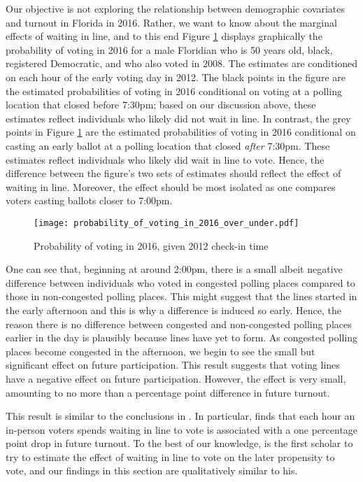 \documentclass[12pt,titlepage]{article}
\begin{document}
Our objective is not exploring the relationship between demographic
covariates and turnout in Florida in 2016.  Rather, we want to know
about the marginal effects of waiting in line, and to this end Figure
\ref{fig:prvoting2016} displays graphically the probability of voting
in 2016 for a male Floridian who is 50 years old, black, registered
Democratic, and who also voted in 2008.  The estimates are conditioned
on each hour of the early voting day in 2012. The black points in the
figure are the estimated probabilities of voting in 2016 conditional
on voting at a polling location that closed before 7:30pm; based on
our discussion above, these estimates reflect individuals who likely
did not wait in line.  In contrast, the grey points in Figure
\ref{fig:prvoting2016} are the estimated probabilities of voting in
2016 conditional on casting an early ballot at a polling location that
closed \emph{after} 7:30pm.  These estimates reflect individuals who
likely did wait in line to vote.  Hence, the difference between the
figure's two sets of estimates should reflect the effect of waiting in
line.  Moreover, the effect should be most isolated as one compares
voters casting ballots closer to 7:00pm.

\begin{figure}[!ht]
\caption{Probability of voting in 2016, given 2012 check-in time}
  \label{fig:prvoting2016}
  \centering
    \centering\texttt{[image: probability\_of\_voting\_in\_2016\_over\_under.pdf]}
\end{figure}

One can see that, beginning at around 2:00pm, there is a small albeit
negative difference between individuals who voted in congested polling
places compared to those in non-congested polling places.  This might
suggest that the lines started in the early afternoon and this is why
a difference is induced so early.  Hence, the reason there is no
difference between congested and non-congested polling places earlier
in the day is plausibly because lines have yet to form. As congested
polling places become congested in the afternoon, we begin to see the
small but significant effect on future participation.  This result
suggests that voting lines have a negative effect on future
participation.  However, the effect is very small, amounting to no
more than a percentage point difference in future turnout.

This result is similar to the conclusions in
\citet{pettigrew:longlinesminorityprecincts}.  In particular,
\citeauthor{pettigrew:longlinesminorityprecincts} finds that each hour
an in-person voters spends waiting in line to vote is associated with
a one percentage point drop in future turnout.  To the best of our
knowledge, \citeauthor{pettigrew:longlinesminorityprecincts} is the
first scholar to try to estimate the effect of waiting in line to vote
on the later propensity to vote, and our findings in this section are
qualitatively similar to his.
\end{document}
